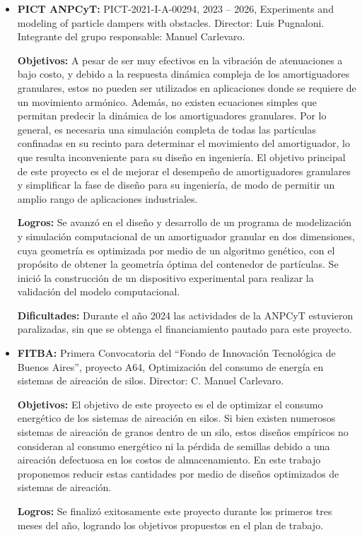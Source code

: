 \documentclass[a4paper,11pt,twoside,final,titlepage,onecolumn,openright]{report}
\begin{document}
\begin{itemize}
\item \textbf{PICT ANPCyT:} PICT-2021-I-A-00294, 2023 -- 2026, Experiments and modeling of particle dampers with obstacles. Director: Luis Pugnaloni. Integrante del grupo responsable: Manuel Carlevaro.

    \textbf{Objetivos:} A pesar de ser muy efectivos en la vibración de atenuaciones a bajo costo, y debido a la respuesta dinámica compleja de los amortiguadores granulares, estos no pueden ser utilizados en aplicaciones donde se requiere de un movimiento armónico. Además, no existen ecuaciones simples que permitan predecir la dinámica de los amortiguadores granulares. Por lo general, es necesaria una simulación completa de todas las partículas confinadas en su recinto para determinar el movimiento del amortiguador, lo que resulta inconveniente para su diseño en ingeniería. El objetivo principal de este proyecto es el de mejorar el desempeño de amortiguadores granulares y simplificar la fase de diseño para su ingeniería, de modo de permitir un amplio rango de aplicaciones industriales.

    \textbf{Logros: } Se avanzó en el diseño y desarrollo de un programa de modelización y simulación computacional de un amortiguador granular en dos dimensiones, cuya geometría es optimizada por medio de un algoritmo genético, con el propósito de obtener la geometría óptima del contenedor de partículas. Se inició la construcción de un dispositivo experimental para realizar la validación del modelo computacional.

\textbf{Dificultades:} Durante el año 2024 las actividades de la ANPCyT estuvieron paralizadas, sin que se obtenga el financiamiento pautado para este proyecto.

\item \textbf{FITBA:} Primera Convocatoria del ``Fondo de Innovación Tecnológica de Buenos Aires'', proyecto A64, Optimización del consumo de energía en sistemas de aireación de silos. Director: C. Manuel Carlevaro.

\textbf{Objetivos:} El objetivo de este proyecto es el de optimizar el consumo energético de los sistemas de aireación en silos. Si bien existen numerosos sistemas de aireación de granos dentro de un silo, estos diseños empíricos no consideran al consumo energético ni la pérdida de semillas debido a una aireación defectuosa en los costos de almacenamiento. En este trabajo proponemos reducir estas cantidades por medio de diseños optimizados de sistemas de aireación.

    \textbf{Logros: } Se finalizó exitosamente este proyecto durante los primeros tres meses del año, logrando los objetivos propuestos en el plan de trabajo. 


\end{itemize}
\end{document}
